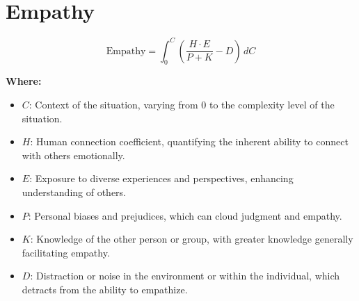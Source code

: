 \chapter{Empathy}

\begin{equation}
\text{Empathy} = \int_{0}^{C} \left(\frac{H \cdot E}{P + K} - D\right) \, dC
\end{equation}

\textbf{Where:}

\begin{itemize}
    \item $C$: Context of the situation, varying from $0$ to the complexity level of the situation.
    \item $H$: Human connection coefficient, quantifying the inherent ability to connect with others emotionally.
    \item $E$: Exposure to diverse experiences and perspectives, enhancing understanding of others.
    \item $P$: Personal biases and prejudices, which can cloud judgment and empathy.
    \item $K$: Knowledge of the other person or group, with greater knowledge generally facilitating empathy.
    \item $D$: Distraction or noise in the environment or within the individual, which detracts from the ability to empathize.
\end{itemize}